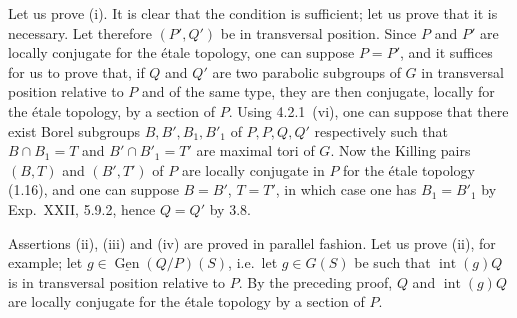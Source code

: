 Let us prove (i). It is clear that the condition is sufficient; let us prove that it is necessary. Let therefore $(P',Q')$ be in transversal position. Since $P$ and $P'$ are locally conjugate for the \'etale topology, one can suppose $P=P'$, and it suffices for us to prove that, if $Q$ and $Q'$ are two parabolic subgroups of $G$ in transversal position relative to $P$ and of the same type, they are then conjugate, locally for the \'etale topology, by a section of $P$. Using 4.2.1~(vi), one can suppose that there exist Borel subgroups $B,B',B_1,B'_1$ of $P,P,Q,Q'$ respectively such that $B\cap B_1=T$ and $B'\cap B'_1=T'$ are maximal tori of $G$. Now the Killing pairs $(B,T)$ and $(B',T')$ of $P$ are locally conjugate in $P$ for the \'etale topology (1.16), and one can suppose $B=B'$, $T=T'$, in which case one has $B_1=B'_1$ by Exp.~XXII, 5.9.2, hence $Q=Q'$ by 3.8.

Assertions (ii), (iii) and (iv) are proved in parallel fashion. Let us prove (ii), for example; let $g\in\underline{\operatorname{Gen}}(Q/P)(S)$, i.e.~let $g\in G(S)$ be such that $\operatorname{int}(g)Q$ is in transversal position relative to $P$. By the preceding proof, $Q$ and $\operatorname{int}(g)Q$ are locally conjugate for the \'etale topology by a section of $P$.

